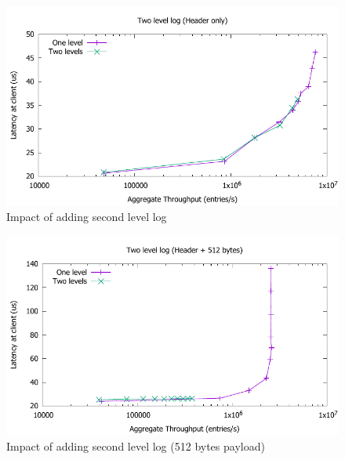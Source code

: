 \documentclass[10pt, preprint, nonatbib]{sigplanconf}
\begin{document}
\begin{figure}
\includegraphics[scale=0.6]{results2/flashlog.pdf}
\caption{Impact of adding second level log}
\label{fig:flashlog}
\end{figure}

\begin{figure}
\includegraphics[scale=0.6]{results2/flashlog_512.pdf}
\caption{Impact of adding second level log (512 bytes payload)}
\label{fig:flashlog_512}
\end{figure}
\end{document}
